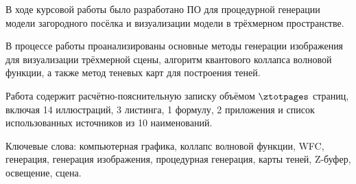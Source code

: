 
В ходе курсовой работы было разработано ПО для процедурной генерации модели загородного посёлка и визуализации модели в трёхмерном пространстве.

В процессе работы проанализированы основные методы генерации изображения для визуализации трёхмерной сцены, алгоритм квантового коллапса волновой функции, а также метод теневых карт для построения теней.

Работа содержит расчётно-пояснительную записку объёмом
$\text{\ztotpages}$ 
страниц, включая 14 иллюстраций, 3 листинга, 1 формулу, 2 приложения и список использованных источников из 10 наименований.

Ключевые слова: компьютерная графика, коллапс волновой функции, WFC, генерация, генерация изображения, процедурная генерация, карты теней, Z-буфер, освещение, сцена.

\pagebreak
